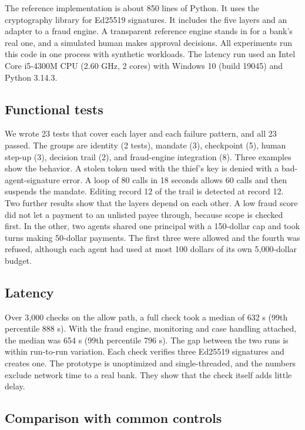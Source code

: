 \documentclass[conference]{IEEEtran}
\begin{document}
The reference implementation is about 850 lines of Python. It uses the cryptography library for Ed25519 signatures. It includes the five layers and an adapter to a fraud engine. A transparent reference engine stands in for a bank's real one, and a simulated human makes approval decisions. All experiments run this code in one process with synthetic workloads. The latency run used an Intel Core i5-4300M CPU (2.60 GHz, 2 cores) with Windows 10 (build 19045) and Python 3.14.3.

\subsection{Functional tests}

We wrote 23 tests that cover each layer and each failure pattern, and all 23 passed. The groups are identity (2 tests), mandate (3), checkpoint (5), human step-up (3), decision trail (2), and fraud-engine integration (8). Three examples show the behavior. A stolen token used with the thief's key is denied with a bad-agent-signature error. A loop of 80 calls in 18 seconds allows 60 calls and then suspends the mandate. Editing record 12 of the trail is detected at record 12. Two further results show that the layers depend on each other. A low fraud score did not let a payment to an unlisted payee through, because scope is checked first. In the other, two agents shared one principal with a 150-dollar cap and took turns making 50-dollar payments. The first three were allowed and the fourth was refused, although each agent had used at most 100 dollars of its own 5,000-dollar budget.

\subsection{Latency}

Over 3,000 checks on the allow path, a full check took a median of 632 \textmu s (99th percentile 888 \textmu s). With the fraud engine, monitoring and case handling attached, the median was 654 \textmu s (99th percentile 796 \textmu s). The gap between the two runs is within run-to-run variation. Each check verifies three Ed25519 signatures and creates one. The prototype is unoptimized and single-threaded, and the numbers exclude network time to a real bank. They show that the check itself adds little delay.

\subsection{Comparison with common controls}
\end{document}
